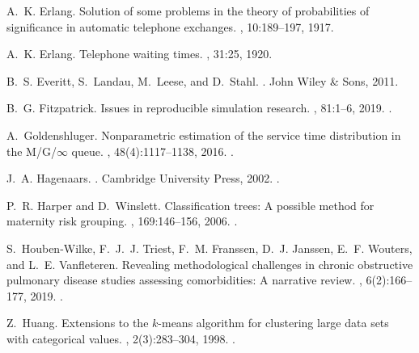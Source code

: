 \documentclass[11pt]{article}
\begin{document}
\begin{thebibliography}{10}
A.~K. Erlang.
\newblock Solution of some problems in the theory of probabilities of
  significance in automatic telephone exchanges.
, 10:189--197, 1917.

A.~K. Erlang.
\newblock Telephone waiting times.
, 31:25, 1920.

B.~S. Everitt, S.~Landau, M.~Leese, and D.~Stahl.
.
\newblock John Wiley \& Sons, 2011.

B.~G. Fitzpatrick.
\newblock Issues in reproducible simulation research.
, 81:1--6, 2019.
\newblock \href {https://doi.org/10.1007/s11538-018-0496-1}
  {}.

A.~Goldenshluger.
\newblock Nonparametric estimation of the service time distribution in the
  {M/G/$\infty$} queue.
, 48(4):1117--1138, 2016.
\newblock \href {https://doi.org/10.1017/apr.2016.67}
  {}.

J.~A. Hagenaars.
.
\newblock Cambridge University Press, 2002.
\newblock \href {https://doi.org/10.1017/CBO9780511499531}
  {}.

P.~R. Harper and D.~Winslett.
\newblock Classification trees: A possible method for maternity risk grouping.
, 169:146--156, 2006.
\newblock \href {https://doi.org/10.1016/j.ejor.2004.05.014}
  {}.

S.~Houben-Wilke, F.~J.~J. Triest, F.~M. Franssen, D.~J. Janssen, E.~F. Wouters,
  and L.~E. Vanfleteren.
\newblock Revealing methodological challenges in chronic obstructive pulmonary
  disease studies assessing comorbidities: A narrative review.
, 6(2):166--177, 2019.
\newblock \href {https://doi.org/10.15326/jcopdf.6.2.2018.0145}
  {}.

Z.~Huang.
\newblock Extensions to the $k$-means algorithm for clustering large data sets
  with categorical values.
, 2(3):283--304, 1998.
\newblock \href {https://doi.org/10.1023/A:1009769707641}
  {}.


\end{thebibliography}
\end{document}
